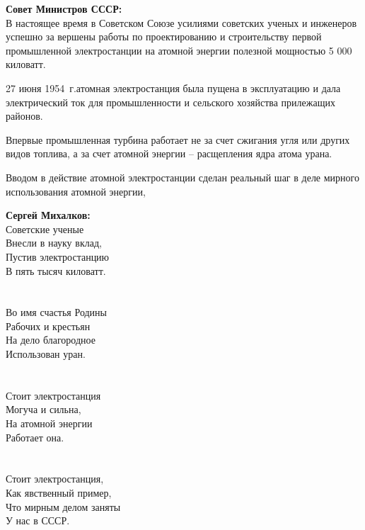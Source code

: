 \documentclass{book}
\begin{document}
\vspace*{1em}

\begin{minipage}{0.4\textwidth}
  \textbf{Совет Министров СССР:}\\
  В настоящее время в Советском Союзе усилиями советских ученых и инженеров успешно за вершены работы по проектированию и строительству первой промышленной электростанции на атомной энергии полезной мощностью 5 000 киловатт.
  
  27 июня 1954~г.атомная электростанция была пущена в эксплуатацию и дала электрический ток для промышленности и сельского
  хозяйства прилежащих районов.
  
  Впервые промышленная турбина работает не за счет сжигания угля или других видов топлива, а за счет атомной энергии -- расщепления ядра атома урана. 
  
  Вводом в действие атомной электростанции сделан реальный шаг  в деле мирного использования атомной энергии, 
\end{minipage}
\hfill
\begin{minipage}{0.4\textwidth}
  \textbf{Сергей Михалков:}\\
  Советские ученые \\
  Внесли в науку вклад, \\
  Пустив электростанцию \\
  В пять тысяч киловатт. \\
  \\ \\
  Во имя счастья Родины \\
  Рабочих и крестьян \\
  На дело благородное \\
  Использован уран. \\
  \\  \\
  Стоит электростанция \\
  Могуча и сильна, \\
  На атомной энергии \\
  Работает она. \\
  \\  \\  
  Стоит электростанция, \\
  Как явственный пример, \\
  Что мирным делом заняты \\
  У нас в СССР.
\end{minipage}

\vspace*{1em}
\end{document}
